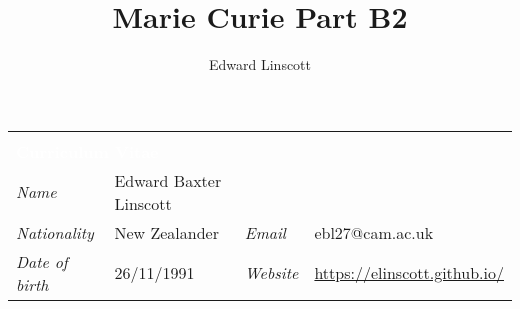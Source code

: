 \documentclass[10pt,a4paper,final]{article}
\author{Edward Linscott}
\title{Marie Curie Part B2}
\begin{document}
\begin{table}[t!]
\begin{tabularx}{\textwidth}{l X l X}
\multicolumn{4}{l}{\cellcolor{seaborn_red}} \\[-1.5em]
\multicolumn{4}{l}{\cellcolor{seaborn_red}%
\Huge\textbf{\textcolor{white}{Curriculum Vitae}%
}} \\
\textit{Name         }  & Edward Baxter Linscott & & \\
\textit{Nationality  }  & New Zealander          & \textit{Email  } & ebl27@cam.ac.uk\\
\textit{Date of birth}  & 26/11/1991             & \textit{Website} & \url{https://elinscott.github.io/}\\

\end{tabularx}
\end{table}
\end{document}
